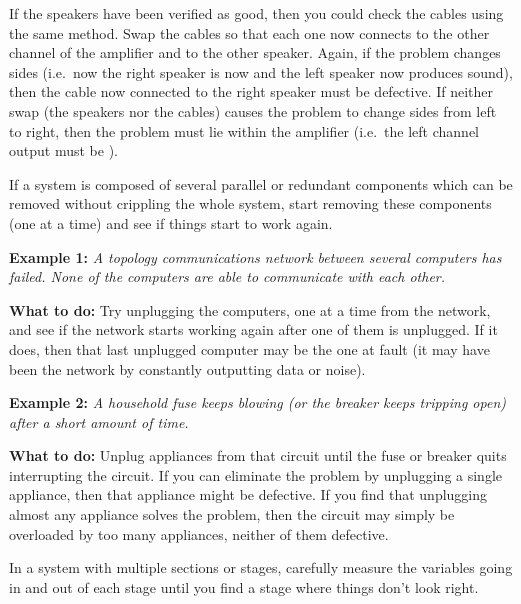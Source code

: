 If the speakers have been verified as good, then you could check the
cables using the same method. Swap the cables so that each one now
connects to the other channel of the amplifier and to the other speaker.
Again, if the problem changes sides (i.e.~now the right speaker is now
 and the left speaker now produces sound), then the
cable now connected to the right speaker must be defective. If neither
swap (the speakers nor the cables) causes the problem to change sides
from left to right, then the problem must lie within the amplifier
(i.e.~the left channel output must be ).

\stopsubsection

\startsubsection[title={Remove Parallel
Components},reference={sec:xtocid15790979}]

If a system is composed of several parallel or redundant components
which can be removed without crippling the whole system, start removing
these components (one at a time) and see if things start to work again.

{\bf Example 1:} {\em A  topology communications network
between several computers has failed. None of the computers are able to
communicate with each other.}

{\bf What to do:} Try unplugging the computers, one at a time from the
network, and see if the network starts working again after one of them
is unplugged. If it does, then that last unplugged computer may be the
one at fault (it may have been  the network by
constantly outputting data or noise).

{\bf Example 2:} {\em A household fuse keeps blowing (or the breaker
keeps tripping open) after a short amount of time.}

{\bf What to do:} Unplug appliances from that circuit until the fuse or
breaker quits interrupting the circuit. If you can eliminate the problem
by unplugging a single appliance, then that appliance might be
defective. If you find that unplugging almost any appliance solves the
problem, then the circuit may simply be overloaded by too many
appliances, neither of them defective.

\stopsubsection

\startsubsection[title={Divide System into Sections and Test Those
Sections},reference={sec:xtocid157909710}]

In a system with multiple sections or stages, carefully measure the
variables going in and out of each stage until you find a stage where
things don't look right.


